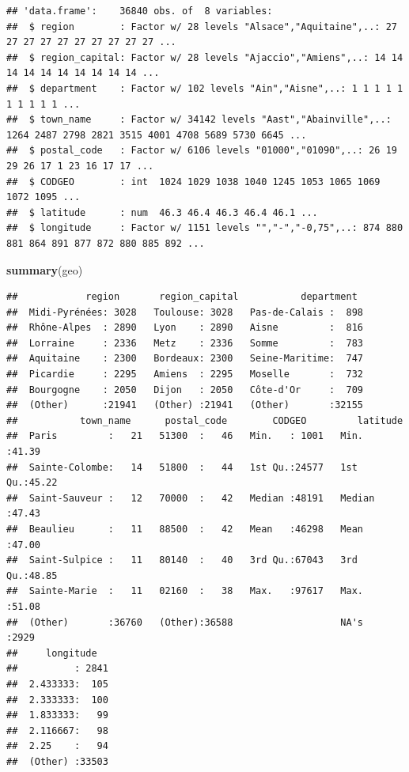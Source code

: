 \documentclass[]{article}
\newenvironment{Shaded}{\begin{snugshade}}{\end{snugshade}}
\newcommand{\KeywordTok}[1]{\textcolor[rgb]{0.13,0.29,0.53}{\textbf{#1}}}
\newcommand{\NormalTok}[1]{#1}
\begin{document}
\begin{verbatim}
## 'data.frame':    36840 obs. of  8 variables:
##  $ region        : Factor w/ 28 levels "Alsace","Aquitaine",..: 27 27 27 27 27 27 27 27 27 27 ...
##  $ region_capital: Factor w/ 28 levels "Ajaccio","Amiens",..: 14 14 14 14 14 14 14 14 14 14 ...
##  $ department    : Factor w/ 102 levels "Ain","Aisne",..: 1 1 1 1 1 1 1 1 1 1 ...
##  $ town_name     : Factor w/ 34142 levels "Aast","Abainville",..: 1264 2487 2798 2821 3515 4001 4708 5689 5730 6645 ...
##  $ postal_code   : Factor w/ 6106 levels "01000","01090",..: 26 19 29 26 17 1 23 16 17 17 ...
##  $ CODGEO        : int  1024 1029 1038 1040 1245 1053 1065 1069 1072 1095 ...
##  $ latitude      : num  46.3 46.4 46.3 46.4 46.1 ...
##  $ longitude     : Factor w/ 1151 levels "","-","-0,75",..: 874 880 881 864 891 877 872 880 885 892 ...
\end{verbatim}

\begin{Shaded}
\begin{Highlighting}[]
\KeywordTok{summary}\NormalTok{(geo)}
\end{Highlighting}
\end{Shaded}

\begin{verbatim}
##            region       region_capital           department   
##  Midi-Pyrénées: 3028   Toulouse: 3028   Pas-de-Calais :  898  
##  Rhône-Alpes  : 2890   Lyon    : 2890   Aisne         :  816  
##  Lorraine     : 2336   Metz    : 2336   Somme         :  783  
##  Aquitaine    : 2300   Bordeaux: 2300   Seine-Maritime:  747  
##  Picardie     : 2295   Amiens  : 2295   Moselle       :  732  
##  Bourgogne    : 2050   Dijon   : 2050   Côte-d'Or     :  709  
##  (Other)      :21941   (Other) :21941   (Other)       :32155  
##           town_name      postal_code        CODGEO         latitude    
##  Paris         :   21   51300  :   46   Min.   : 1001   Min.   :41.39  
##  Sainte-Colombe:   14   51800  :   44   1st Qu.:24577   1st Qu.:45.22  
##  Saint-Sauveur :   12   70000  :   42   Median :48191   Median :47.43  
##  Beaulieu      :   11   88500  :   42   Mean   :46298   Mean   :47.00  
##  Saint-Sulpice :   11   80140  :   40   3rd Qu.:67043   3rd Qu.:48.85  
##  Sainte-Marie  :   11   02160  :   38   Max.   :97617   Max.   :51.08  
##  (Other)       :36760   (Other):36588                   NA's   :2929   
##     longitude    
##          : 2841  
##  2.433333:  105  
##  2.333333:  100  
##  1.833333:   99  
##  2.116667:   98  
##  2.25    :   94  
##  (Other) :33503
\end{verbatim}
\end{document}
